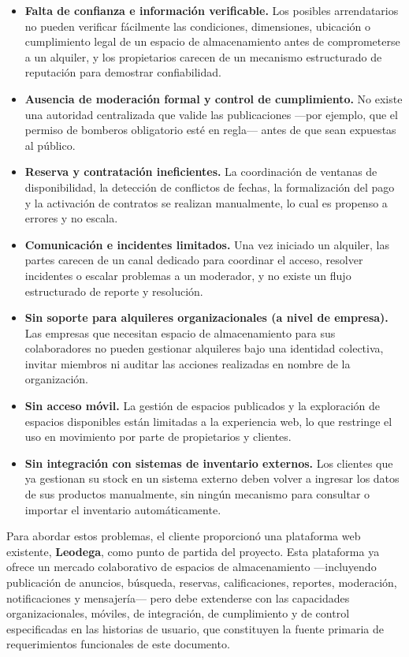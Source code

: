 \begin{itemize}
    \item \textbf{Falta de confianza e información verificable.} Los posibles arrendatarios no pueden verificar fácilmente las condiciones, dimensiones, ubicación o cumplimiento legal de un espacio de almacenamiento antes de comprometerse a un alquiler, y los propietarios carecen de un mecanismo estructurado de reputación para demostrar confiabilidad.
    \item \textbf{Ausencia de moderación formal y control de cumplimiento.} No existe una autoridad centralizada que valide las publicaciones ---por ejemplo, que el permiso de bomberos obligatorio esté en regla--- antes de que sean expuestas al público.
    \item \textbf{Reserva y contratación ineficientes.} La coordinación de ventanas de disponibilidad, la detección de conflictos de fechas, la formalización del pago y la activación de contratos se realizan manualmente, lo cual es propenso a errores y no escala.
    \item \textbf{Comunicación e incidentes limitados.} Una vez iniciado un alquiler, las partes carecen de un canal dedicado para coordinar el acceso, resolver incidentes o escalar problemas a un moderador, y no existe un flujo estructurado de reporte y resolución.
    \item \textbf{Sin soporte para alquileres organizacionales (a nivel de empresa).} Las empresas que necesitan espacio de almacenamiento para sus colaboradores no pueden gestionar alquileres bajo una identidad colectiva, invitar miembros ni auditar las acciones realizadas en nombre de la organización.
    \item \textbf{Sin acceso móvil.} La gestión de espacios publicados y la exploración de espacios disponibles están limitadas a la experiencia web, lo que restringe el uso en movimiento por parte de propietarios y clientes.
    \item \textbf{Sin integración con sistemas de inventario externos.} Los clientes que ya gestionan su stock en un sistema externo deben volver a ingresar los datos de sus productos manualmente, sin ningún mecanismo para consultar o importar el inventario automáticamente.
\end{itemize}

Para abordar estos problemas, el cliente proporcionó una plataforma web existente, \textbf{Leodega}, como punto de partida del proyecto. Esta plataforma ya ofrece un mercado colaborativo de espacios de almacenamiento ---incluyendo publicación de anuncios, búsqueda, reservas, calificaciones, reportes, moderación, notificaciones y mensajería--- pero debe extenderse con las capacidades organizacionales, móviles, de integración, de cumplimiento y de control especificadas en las historias de usuario, que constituyen la fuente primaria de requerimientos funcionales de este documento.

